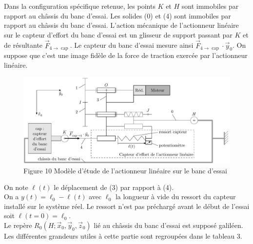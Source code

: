 \documentclass[10pt]{article}
\begin{document}
Dans la configuration spécifique retenue, les points $K$ et $H$ sont immobiles par rapport au châssis du banc d'essai. Les solides (0) et (4) sont immobiles par rapport au châssis du banc d'essai. L'action mécanique de l'actionneur linéaire sur le capteur d'effort du banc d'essai est un glisseur de support passant par $K$ et de résultante $\vec{F}_{4 \rightarrow \text { cap }}$. Le capteur du banc d'essai mesure ainsi $\vec{F}_{4 \rightarrow \text { cap }} \cdot \vec{y}_{0}$. On suppose que c'est une image fidèle de la force de traction exercée par l'actionneur linéaire.

\begin{figure}[h]
\begin{center}
  \includegraphics[width=\textwidth]{2025_09_16_5f2d7643f7e649c6833dg-07}
\captionsetup{labelformat=empty}
\caption{Figure 10 Modèle d'étude de l'actionneur linéaire sur le banc d'essai}
\end{center}
\end{figure}

On note $\ell(t)$ le déplacement de (3) par rapport à (4).\\
On a $y(t)=\ell_{0}-\ell(t)$ avec $\ell_{0}$ la longueur à vide du ressort du capteur installé sur le système réel. Le ressort n'est pas préchargé avant le début de l'essai soit $\ell(t=0)=\ell_{0}$.\\
Le repère $R_{0}\left(H ; \vec{x}_{0}, \vec{y}_{0}, \vec{z}_{0}\right)$ lié au châssis du banc d'essai est supposé galiléen.\\
Les différentes grandeurs utiles à cette partie sont regroupées dans le tableau 3.
\end{document}
